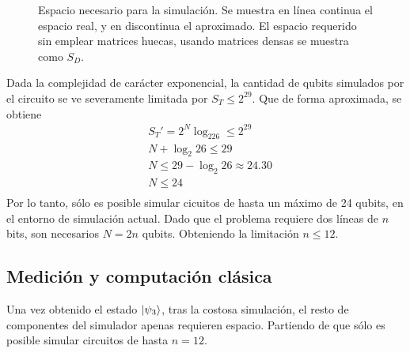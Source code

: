 \begin{figure}[!htb]
\centering
{}
\caption{Espacio necesario para la simulación. Se muestra en línea continua el 
espacio real, y en discontinua el aproximado. El espacio requerido sin emplear 
matrices huecas, usando matrices densas se muestra como $S_D$.}
\label{fig:espacio-qc}
\end{figure}
%
Dada la complejidad de carácter exponencial, la cantidad de qubits simulados por 
el circuito se ve severamente limitada por $S_T \leq 2^{29}$. Que de forma 
aproximada, se obtiene
\begin{equation*}
\begin{split}
&S_T' = 2^N \log_226 \leq 2^{29} \\
&N + \log_2 26 \leq 29 \\
&N \leq 29 - \log_2 26 \approx 24.30 \\
&N \leq 24 \\
\end{split}
\end{equation*}
Por lo tanto, sólo es posible simular cicuitos de hasta un máximo de 24 qubits, 
en el entorno de simulación actual. Dado que el problema requiere dos líneas de 
$n$ bits, son necesarios $N = 2n$ qubits. Obteniendo la limitación $n \leq 12$.


\subsection{Medición y computación clásica}
Una vez obtenido el estado $\ket{\psi_{3}}$, tras la costosa simulación, el resto de 
componentes del simulador apenas requieren espacio. Partiendo de que sólo es 
posible simular circuitos de hasta $n = 12$.



